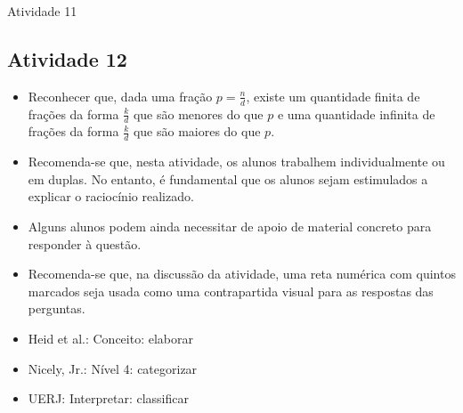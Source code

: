 \begin{multicols}{2}
\begin{resposta*}{Atividade 11}
 \end{resposta*}




\subsection{Atividade 12}

\begin{itemize} %
    \item       Reconhecer que, dada uma fração       $p = \frac{n}{d}$, existe
um quantidade finita de frações da forma       $\frac{k}{d}$       que são
menores do que       $p$       e uma quantidade infinita de frações da forma
  $\frac{k}{d}$       que são maiores do que       $p$.
\end{itemize} %



\begin{itemize} %
    \item       Recomenda-se que, nesta atividade, os alunos trabalhem
individualmente ou em duplas. No entanto, é fundamental que os alunos sejam
estimulados a explicar o raciocínio realizado.
    \item       Alguns alunos podem ainda necessitar de apoio de material
concreto para responder à questão.
    \item       Recomenda-se que, na discussão da atividade, uma reta numérica
com quintos marcados seja usada como uma contrapartida visual para as respostas
das perguntas.
\end{itemize} %


\noindent {}


 \vspace{.1cm}

 \vspace{.1cm}

\begin{itemize} %
    \item       Heid et al.: Conceito: elaborar
    \item       Nicely, Jr.: Nível 4: categorizar
    \item       UERJ: Interpretar: classificar
\end{itemize} %



\end{multicols}
